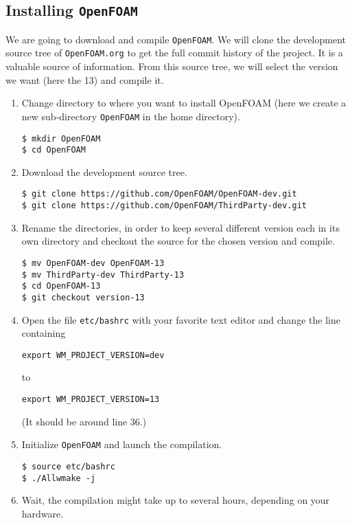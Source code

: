 \documentclass[a4paper]{article}
\newcommand{\OF}{\texttt{OpenFOAM}\xspace}
\begin{document}
\subsection{Installing \OF}
We are going to download and compile \OF. We will clone the
development source tree of \texttt{OpenFOAM.org} to get the full commit
history of the project. It is a valuable source of information.
From this source tree, we will select the version we want (here the 13)
and compile it.
\begin{enumerate}
    \item Change directory to where you want to install OpenFOAM (here we create
        a new sub-directory \OF in the home directory).
\begin{verbatim}
$ mkdir OpenFOAM
$ cd OpenFOAM
\end{verbatim}
    \item Download the development source tree.
\begin{verbatim}
$ git clone https://github.com/OpenFOAM/OpenFOAM-dev.git
$ git clone https://github.com/OpenFOAM/ThirdParty-dev.git            
\end{verbatim}
    \item Rename the directories, in order to keep several different version
        each in its own directory and checkout the source for the chosen 
        version and compile.
\begin{verbatim}
$ mv OpenFOAM-dev OpenFOAM-13
$ mv ThirdParty-dev ThirdParty-13
$ cd OpenFOAM-13
$ git checkout version-13
\end{verbatim}
    \item Open the file \texttt{etc/bashrc} with your favorite text editor and
        change the line containing
\begin{verbatim}
export WM_PROJECT_VERSION=dev
\end{verbatim}
    to
\begin{verbatim}
export WM_PROJECT_VERSION=13
\end{verbatim}
    (It should be around line 36.)
    \item Initialize \OF and launch the compilation.
\begin{verbatim}
$ source etc/bashrc
$ ./Allwmake -j
\end{verbatim}
    \item Wait, the compilation might take up to several hours, 
        depending on your hardware.
\end{enumerate}
\end{document}
